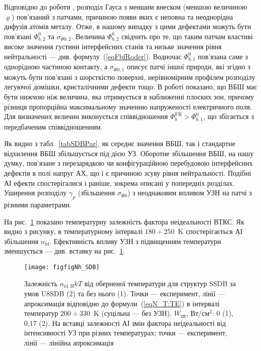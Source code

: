 Відповідно до роботи \cite{Jiang:DGJap},
розподіл Гауса з меншим внеском (меншою величиною $\varrho$) пов'язаний з патчами, причиною появи яких є
неповна та неоднорідна дифузія атомів металу.
Отже, в нашому випадку з цими дефектами можуть бути пов'язані $\Phi_{b,2}^0$ та $\sigma_{\Phi0,2}$.
Величина $\Phi_{b,2}^0$ свідчить про те, що таким патчам властиві високе значення густини інтерфейсних станів та низьке значення рівня нейтральності --- див. формулу~(\ref{eqFbfRoder}).
Водночас $\Phi_{b,1}^0$ пов'язана саме з однорідною частиною контакту,
а $\sigma_{\Phi0,1}$ описує патчі іншої природи, які згідно з \cite{Gammon2013} можуть бути пов'язані з шорсткістю поверхні,
нерівномірним профілем розподілу легуючої домішки, кристалічними дефекти тощо.
В роботі \cite{Rhoderick1988} показано, що ВБШ має бути нижчою ніж величина, яка отримується в наближенні плоских зон,
причому різниця пропорційна максимальному значенню напруженості електричного поля.
Для визначених величин виконується співвідношення $\Phi_{b}^\mathrm{FB}>\Phi_{b,1}^0$, що  збігається з передбаченим співвідношенням.

Як видно з табл.~\ref{tabSDBPar}, як середнє значення ВБШ, так і стандартне відхилення ВБШ збільшується під дією УЗ.
Оборотне збільшення ВБШ, на нашу думку, пов'язане з перезарядкою чи конфігураційною перебудовою інтерфейсних дефектів в полі напруг
АХ, що і є причиною зсуву рівня нейтральності.
Подібні АІ ефекти спостерігалися і раніше, зокрема описані у попередніх розділах.
Уширення розподілу $\gamma_p$ (збільшення $\sigma_{\Phi0}$) з неоднаковим впливом УЗН на патчі з різними параметрами.

На рис.~\ref{figfigNh_SDB} показано температурну залежність фактора неідеальності ВТКС.
Як видно з рисунку, в температурному інтервалі $180\div250$~K спостерігається АІ збільшення $n_\mathrm{id}$.
Ефективність впливу УЗН з підвищенням температури зменшується --- див. вставку на рис.~\ref{figfigNh_SDB}.

\begin{figure}
\center
\texttt{[image: figfigNh\_SDB]}
\caption{\label{figfigNh_SDB}
Залежність $n_\mathrm{id,H}kT$ від оберненої температури для структур SSDB за умов U8SDB (2) та без нього (1).
Точки --- експеримент, лінії --- апроксимація відповідно до формули~(\ref{eqN_T:TE}) в інтервалі
температур $200\div330$~K (суцільна --- без УЗН).
$W_\mathtt{US}$,  Вт/см$^2$: 0 (1), 0,17 (2).
На вставці залежності АІ змін фактора неідеальності від інтенсивності УЗ при різних температурах;
точки --- експеримент, лінії --- лінійна апроксимація
}%
\end{figure}

